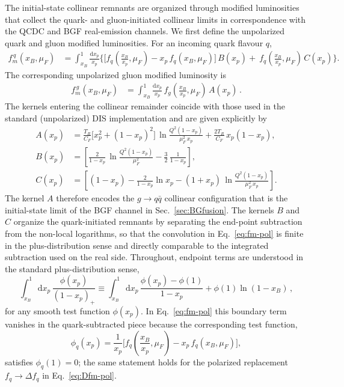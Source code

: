 \documentclass[a4paper,11pt]{article}
\begin{document}
The initial-state collinear remnants are organized through modified luminosities that collect the quark- and gluon-initiated collinear limits in correspondence with the QCDC and BGF real-emission channels.
We first define the unpolarized quark and gluon modified luminosities. For an incoming quark flavour $q$,
\begin{align}
f^{\,q}_m(x_B,\mu_F)
&=\int_{x_B}^{1}\frac{\mathrm{d}x_p}{x_p}\Bigg\{
\Big[f_q\!\left(\frac{x_B}{x_p},\mu_F\right)-x_p\,f_q(x_B,\mu_F)\Big]\,B(x_p)
+\ f_q\!\left(\frac{x_B}{x_p},\mu_F\right)\,C(x_p)
\Bigg\}.
\label{eq:fm-pol}
\end{align}
The corresponding unpolarized gluon modified luminosity is
\begin{align}
f^{\,g}_m(x_B,\mu_F)
&=\int_{x_B}^{1}\frac{\mathrm{d}x_p}{x_p}\,
f_g\!\left(\frac{x_B}{x_p},\mu_F\right)\,A(x_p)\,.
\label{eq:fmg-pol}
\end{align}
The kernels entering the collinear remainder coincide with those used in the standard (unpolarized) DIS implementation and are given explicitly by
\begin{align}
A(x_p)&=\frac{T_R}{C_F}\Big[x_p^2+(1-x_p)^2\Big]\,
\ln\!\frac{Q^2(1-x_p)}{\mu_F^2\,x_p}
+\frac{2T_R}{C_F}\,x_p(1-x_p),
\label{eq:A-kernel}\\[1mm]
B(x_p)&=\left[\frac{2}{1-x_p}\,\ln\!\frac{Q^2(1-x_p)}{\mu_F^2}-\frac{3}{2}\,\frac{1}{1-x_p}\right],
\label{eq:B-kernel}\\[1mm]
C(x_p)&=\left[(1-x_p)-\frac{2}{1-x_p}\ln x_p-(1+x_p)\,\ln\!\frac{Q^2(1-x_p)}{\mu_F^2\,x_p}\right].
\label{eq:C-kernel}
\end{align}
The kernel $A$ therefore encodes the $g\!\to\! q\bar q$ collinear configuration that is the initial-state limit of the BGF channel in Sec.~\ref{sec:BGfusion}. The kernels $B$ and $C$ organize the quark-initiated remnants by separating the end-point subtraction from the non-local logarithms, so that the convolution in Eq.~\eqref{eq:fm-pol} is finite in the plus-distribution sense and directly comparable to the integrated subtraction used on the real side.
Throughout, endpoint terms are understood in the standard plus-distribution sense,
\begin{equation}
  \int_{x_B}^{1}\!\mathrm{d}x_p\,\frac{\phi(x_p)}{(1-x_p)_+}
  \equiv
  \int_{x_B}^{1}\!\mathrm{d}x_p\,\frac{\phi(x_p)-\phi(1)}{1-x_p}
  +\phi(1)\ln(1-x_B)\,,
\end{equation}
for any smooth test function $\phi(x_p)$.
In Eq.~\eqref{eq:fm-pol} this boundary term vanishes in the quark-subtracted piece because the corresponding test function,
\begin{equation}
  \phi_q(x_p)=\frac{1}{x_p}\Big[f_q\!\left(\frac{x_B}{x_p},\mu_F\right)-x_p\,f_q(x_B,\mu_F)\Big],
\end{equation}
satisfies $\phi_q(1)=0$; the same statement holds for the polarized replacement $f_q\to\Delta f_q$ in Eq.~\eqref{eq:Dfm-pol}.
\end{document}
